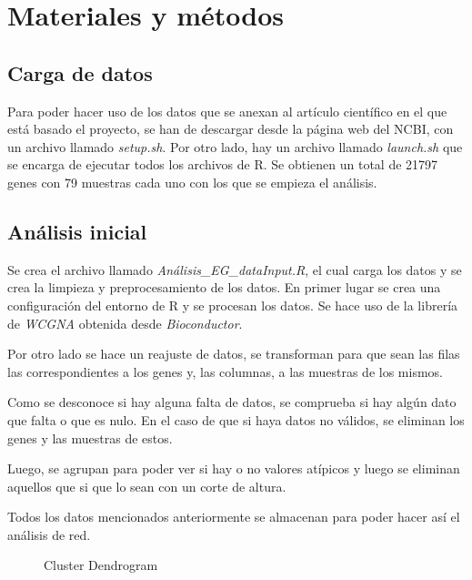 \section{Materiales y métodos}
\subsection{Carga de datos}
Para poder hacer uso de los datos que se anexan al artículo científico en el que está basado el proyecto, se han de descargar desde la página web del NCBI, con un archivo llamado \textit{setup.sh}. Por otro lado, hay un archivo llamado \textit{launch.sh} que se encarga de ejecutar todos los archivos de R. Se obtienen un total de 21797 genes con 79 muestras cada uno con los que se empieza el análisis.

\subsection{Análisis inicial}
Se crea el archivo llamado \textit{Análisis\_EG\_dataInput.R}, el cual carga los datos y se crea la limpieza y preprocesamiento de los datos. En primer lugar se crea una configuración del entorno de R y se procesan los datos. Se hace uso de la librería de \textit{WCGNA} obtenida desde \textit{Bioconductor}. 

Por otro lado se hace un reajuste de datos, se transforman para que sean las filas las correspondientes a los genes y, las columnas, a las muestras de los mismos.

Como se desconoce si hay alguna falta de datos, se comprueba si hay algún dato que falta o que es nulo. En el caso de que si haya datos no válidos, se eliminan los genes y las muestras de estos.

Luego, se agrupan para poder ver si hay o no valores atípicos y luego se eliminan aquellos que si que lo sean con un corte de altura. 

Todos los datos mencionados anteriormente se almacenan para poder hacer así el análisis de red.

\begin{figure}[h]
	\caption{Cluster Dendrogram}
	\label{fig:clusterDendrogram}
\end{figure}

